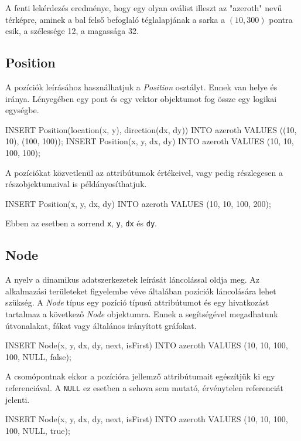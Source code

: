A fenti lekérdezés eredménye, hogy egy olyan oválist illeszt az "azeroth" nevű térképre, aminek a bal felső befoglaló téglalapjának a sarka a $(10, 300)$ pontra esik, a szélessége 12, a magassága 32. 

\subsection{Position}

A pozíciók leírásához használhatjuk a \textit{Position} osztályt. Ennek van helye és iránya. Lényegében egy pont és egy vektor objektumot fog össze egy logikai egységbe.

\begin{sql}
INSERT Position(location(x, y), direction(dx, dy)) INTO
azeroth VALUES ((10, 10), (100, 100));
INSERT Position(x, y, dx, dy) INTO azeroth VALUES (10, 10, 100, 100);
\end{sql}

A pozíciókat közvetlenül az attribútumok értékeivel, vagy pedig részlegesen a részobjektumaival is példányosíthatjuk.

\begin{sql}
INSERT Position(x, y, dx, dy) INTO azeroth VALUES (10, 10, 100, 200);
\end{sql}

Ebben az esetben a sorrend \texttt{x}, \texttt{y}, \texttt{dx} és \texttt{dy}. 


\subsection{Node}

A nyelv a dinamikus adatszerkezetek leírását láncolással oldja meg. Az alkalmazási területeket figyelembe véve általában pozíciók láncolására lehet szükség. A \textit{Node} típus egy pozíció típusú attribútumot és egy hivatkozást tartalmaz a következő \textit{Node} objektumra. Ennek a segítségével megadhatunk útvonalakat, fákat vagy általános irányított gráfokat.

\begin{sql}
INSERT Node(x, y, dx, dy, next, isFirst) INTO 
azeroth VALUES (10, 10, 100, 100, NULL, false);
\end{sql}

A csomópontnak ekkor a pozícióra jellemző attribútumait egészítjük ki egy referenciával. A \texttt{NULL} ez esetben a sehova sem mutató, érvénytelen referenciát jelenti.


\begin{sql}
INSERT Node(x, y, dx, dy, next, isFirst) INTO 
azeroth VALUES (10, 10, 100, 100, NULL, true);
\end{sql}


